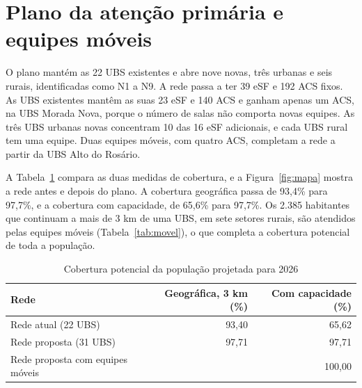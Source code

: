 \section{Plano da atenção primária e equipes móveis}

O plano mantém as 22 UBS existentes e abre nove novas, três urbanas e seis rurais, identificadas como N1
a N9. A rede passa a ter 39 eSF e 192 ACS fixos. As UBS existentes mantêm as suas 23 eSF e 140 ACS e
ganham apenas um ACS, na UBS Morada Nova, porque o número de salas não comporta novas equipes. As três
UBS urbanas novas concentram 10 das 16 eSF adicionais, e cada UBS rural tem uma equipe. Duas equipes
móveis, com quatro ACS, completam a rede a partir da UBS Alto do Rosário.

A Tabela~\ref{tab:cobertura} compara as duas medidas de cobertura, e a Figura~\ref{fig:mapa} mostra a
rede antes e depois do plano. A cobertura geográfica passa de 93,4\% para 97,7\%, e a cobertura com
capacidade, de 65,6\% para 97,7\%. Os 2.385 habitantes que continuam a mais de 3 km de uma UBS, em sete
setores rurais, são atendidos pelas equipes móveis (Tabela~\ref{tab:movel}), o que completa a cobertura
potencial de toda a população.

\begin{table}[htbp]\centering
\caption{Cobertura potencial da população projetada para 2026}\label{tab:cobertura}
\begin{tabular}{lrr}\toprule
Rede & Geográfica, 3 km (\%) & Com capacidade (\%)\\\midrule
Rede atual (22 UBS) & 93,40 & 65,62\\
Rede proposta (31 UBS) & 97,71 & 97,71\\
Rede proposta com equipes móveis & & 100,00\\
\bottomrule\end{tabular}
\end{table}


